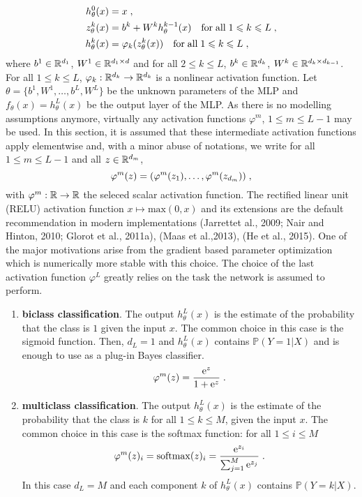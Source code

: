 \begin{align*}
h_{\theta}^0(x) &= x\;,\\
z_{\theta}^k(x)  &= b^k + W^kh_{\theta}^{k-1}(x)\quad \mathrm{for\;all\;} 1\leqslant k\leqslant L\;,\\
h_{\theta}^k(x)  &= \varphi_k(z_{\theta}^{k}(x))\quad \mathrm{for\;all\;}1\leqslant k\leqslant L\;,
\end{align*}
where $b^1\in\mathbb{R}^{d_1}$, $W^1\in\mathbb{R}^{d_1\times d}$ and for all $2\leqslant k\leqslant L$, $b^k\in\mathbb{R}^{d_k}$, $W^k\in\mathbb{R}^{d_k\times d_{k-1}}$. For all $1\leqslant k\leqslant L$, $\varphi_k: \mathbb{R}^{d_k} \to \mathbb{R}^{d_k}$ is a nonlinear activation function. Let $\theta = \{b^1,W^1,\ldots,b^L,W^L\}$ be the unknown parameters of the MLP and $f_{\theta}(x) = h_{\theta}^L(x)$ be the output layer of the MLP. As there is no modelling assumptions anymore, virtually any activation functions $\varphi^m$, $1\leqslant m\leqslant L-1$ may be used. In this section, it is assumed that these intermediate activation functions apply elementwise and, with a minor abuse of notations, we write for all $1\leqslant m\leqslant L-1$ and all $z\in\mathbb{R}^{d_m}$,
$$
\varphi^m(z) = (\varphi^m(z_1),\ldots, \varphi^m(z_{d_m}))\;,
$$
with $\varphi^m: \mathbb{R}\to \mathbb{R}$ the seleced scalar activation function. The rectified linear unit (RELU) activation function $x \mapsto \mathrm{max}(0,x)$ and its extensions are the default recommendation in modern implementations  (Jarrettet al., 2009; Nair and Hinton, 2010; Glorot et al., 2011a), (Maas et al.,2013),  (He et al., 2015). One of the major motivations arise from the gradient based parameter optimization which is numerically more stable with this choice. The choice of the last activation function $\varphi^L$ greatly relies on the task the network is assumed to perform.
\begin{enumerate}[-]
\item {\bf biclass classification}. The output $h_{\theta}^L(x)$ is the estimate of the probability that the class is $1$ given the input $x$. The common choice in this case is the sigmoid function. Then, $d_L = 1$ and $h_{\theta}^L(x)$ contains $\mathbb{P}(Y=1 | X)$ and is enough to use as a plug-in Bayes classifier.
\[
\varphi^m(z) =  \frac{\mathrm{e}^{z}}{1 + \mathrm{e}^{z}}\;.
\]
\item {\bf multiclass classification}. The output $h_{\theta}^L(x)$ is the estimate of the probability that the class is  $k$ for all $1\leqslant k\leqslant M$, given the input $x$. The common choice in this case is the softmax function: for all $1\leqslant i\leqslant M$
\[
\varphi^m(z)_i = \mathrm{softmax}(z)_i = \frac{\mathrm{e}^{z_i}}{\sum_{j=1}^M\mathrm{e}^{z_j}}\;.
\]
In this case $d_L = M$ and each component $k$ of $h_{\theta}^L(x)$ contains $\mathbb{P}(Y=k | X)$.
\end{enumerate}
